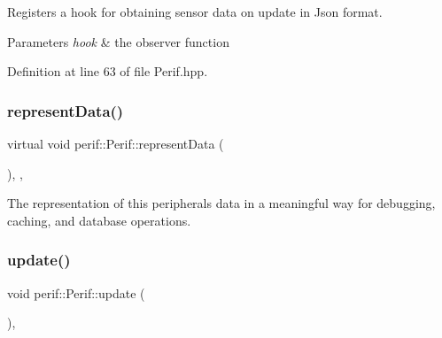 Registers a hook for obtaining sensor data on update in Json format.


\begin{DoxyParams}{Parameters}
{\em hook} & the observer function \\
\hline
\end{DoxyParams}


Definition at line 63 of file Perif.\+hpp.


\begin{DoxyCode}{0}

\end{DoxyCode}
\mbox{\label{classperif_1_1Perif_a556c780e9e4623aa6b7c3d167ef23e6b}} 
\subsubsection{\texorpdfstring{representData()}{representData()}}
{\footnotesize\ttfamily virtual void perif\+::\+Perif\+::represent\+Data (\begin{DoxyParamCaption}{ }\end{DoxyParamCaption})\hspace{0.3cm}{\ttfamily [protected]}, {}, {\ttfamily [inherited]}}

The representation of this peripheral\textquotesingle{}s data in a meaningful way for debugging, caching, and database operations. \mbox{\label{classperif_1_1Perif_ad6fe1a13354bba4af4cc2751399ed93c}} 
\subsubsection{\texorpdfstring{update()}{update()}}
{\footnotesize\ttfamily void perif\+::\+Perif\+::update (\begin{DoxyParamCaption}{ }\end{DoxyParamCaption})\hspace{0.3cm}{\ttfamily [inline]}, {\ttfamily [inherited]}}

